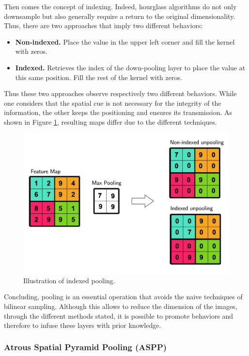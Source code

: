 Then comes the concept of indexing. Indeed, hourglass algorithms do not only downsample but also generally require a return to the original dimensionality. Thus, there are two approaches that imply two different behaviors:
\begin{itemize}
	\item \textbf{Non-indexed. } Place the value in the upper left corner and fill the kernel with zeros.
	\item \textbf{Indexed. } Retrieves the index of the down-pooling layer to place the value at this same position. Fill the rest of the kernel with zeros.
\end{itemize}

Thus these two approaches observe respectively two different behaviors. While one considers that the spatial cue is not necessary for the integrity of the information, the other keeps the positioning and ensures its transmission. As shown in Figure \ref{fig:indexed}, resulting maps differ due to the different techniques.

\begin{figure}[h]
	\centering
	\includegraphics[width=0.8\linewidth]{Figures/Preliminary/indexed}
	\caption{Illustration of indexed pooling.}
	\label{fig:indexed}
\end{figure}


Concluding, pooling is an essential operation that avoids the naive techniques of bilinear sampling. Although this allows to reduce the dimension of the images, through the different methods stated, it is possible to promote behaviors and therefore to infuse these layers with prior knowledge.

\subsubsection{Atrous Spatial Pyramid Pooling (ASPP)}

